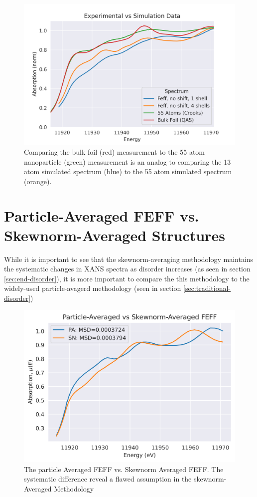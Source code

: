 \begin{figure}[h]
	\centering
	\includegraphics[width=.7\linewidth]{Chapters/Figures/Bulk_55atom_experimental_theory_comparison.png}
	\caption[Simulation vs. Experimental 2]{Comparing the bulk foil (red) measurement to the 55 atom nanoparticle (green) measurement is an analog to comparing the 13 atom simulated spectrum (blue) to the 55 atom simulated spectrum (orange).}
	\label{fig:avg-experimental-vs-simulation2}
\end{figure}

\section{Particle-Averaged FEFF vs. Skewnorm-Averaged Structures} \label{sec:pa-feff-vs-gaussian-feff}
While it is important to see that the skewnorm-averaging methodology maintains the systematic changes in XANS spectra as disorder increases (as seen in section \ref{sec:end-disorder}), it is more important to compare the this methodology to the widely-used particle-avagerd methodology (seen in section \ref{sec:traditional-disorder})

\begin{figure}[!h]
	\centering
	\label{fig:pa-vs-sknm-feff}
	\includegraphics[width=.75\linewidth]{Chapters/Figures/PA-vs-skewnorm-newvals.png}
	\caption[Particle-Averaged vs. Skewnorm-Averaged FEFF Low-Disorder]{The particle Averaged FEFF vs. Skewnorm Averaged FEFF. The systematic difference reveal a flawed assumption in the skewnorm-Averaged Methodology}
\end{figure}

